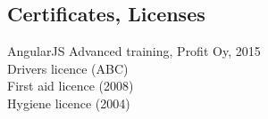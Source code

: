 \documentclass[margin,line]{resume}
\begin{document}
\begin{resume}
\section{\mysidestyle Certificates, Licenses} 
AngularJS Advanced training, Profit Oy, 2015 \\
Drivers licence (ABC) \\
First aid licence (2008) \\
Hygiene licence (2004) \\

\end{resume}
\end{document}
